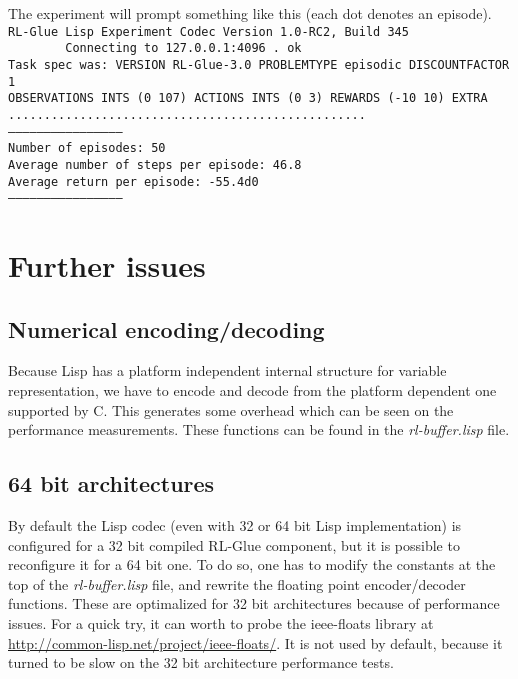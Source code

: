 \documentclass[11pt,a4paper,dvipdfm]{article}
\newcommand{\selfref}[1]{\href{#1}{#1}}
\newcommand{\prompttext}[1]{\texttt{#1}}
\begin{document}
\newpage

The experiment will prompt something like this (each dot denotes an episode). \\
\prompttext{RL-Glue Lisp Experiment Codec Version 1.0-RC2, Build 345 \\
\mbox{~~~~~~~~}Connecting to 127.0.0.1:4096 .~ok \\
Task spec was:~VERSION RL-Glue-3.0 PROBLEMTYPE episodic DISCOUNTFACTOR 1 \\
OBSERVATIONS INTS (0 107) ACTIONS INTS (0 3) REWARDS (-10 10) EXTRA \\
.................................................. \\
----------------------------------------------- \\
Number of episodes:~50 \\
Average number of steps per episode:~46.8 \\
Average return per episode:~-55.4d0 \\
-----------------------------------------------}


\section{Further issues}

\subsection{Numerical encoding/decoding}

Because Lisp has a platform independent internal structure for variable
representation, we have to encode and decode from the platform dependent
one supported by C. This generates some overhead which can be seen on the
performance measurements. These functions can be found in the
\textsl{rl-buffer.lisp} file. 

\subsection{64 bit architectures}

By default the Lisp codec (even with 32 or 64 bit Lisp implementation) is
configured for a 32 bit compiled RL-Glue component, but it is possible to
reconfigure it for a 64 bit one. To do so, one has to modify the constants
at the top of the \textsl{rl-buffer.lisp} file, and rewrite the floating
point encoder/decoder functions. These are optimalized for 32 bit
architectures because of performance issues. For a quick try, it can worth
to probe the ieee-floats library
at \selfref{http://common-lisp.net/project/ieee-floats/}. It is not used by
default, because it turned to be slow on the 32 bit architecture performance
tests.
\end{document}
